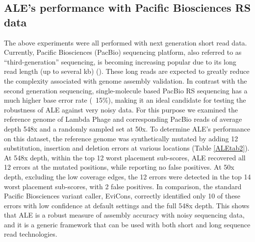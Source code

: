 \documentclass[phd,tocprelim]{cornell}
\begin{document}
\subsection{ALE's performance with Pacific Biosciences RS data}
The above experiments were all performed with next generation short read data. Currently, Pacific Biosciences (PacBio) sequencing platform, also referred to as “third-generation” sequencing, is becoming increasing popular due to its long read length (up to several kb) (\cite{Eid2009}). These long reads are expected to greatly reduce the complexity associated with genome assembly validation. In contrast with the second generation sequencing, single-molecule based PacBio RS sequencing has a much higher base error rate (~15\%), making it an ideal candidate for testing the robustness of ALE against very noisy data. For this purpose we examined the reference genome of Lambda Phage and corresponding PacBio reads of average depth 548x and a randomly sampled set at 50x. To determine ALE's performance on this dataset, the reference genome was synthetically mutated by adding 12 substitution, insertion and deletion errors at various locations (Table \ref{ALEtab2}). At 548x depth, within the top 12 worst placement sub-scores, ALE recovered all 12 errors at the mutated positions, while reporting no false positives. At 50x depth, excluding the low coverage edges, the 12 errors were detected in the top 14 worst placement sub-scores, with 2 false positives.  In comparison, the standard Pacific Biosciences variant caller, EviCons, correctly identified only 10 of these errors with low confidence at default settings and the full 548x depth. This shows that ALE is a robust measure of assembly accuracy with noisy sequencing data, and it is a generic framework that can be used with both short and long sequence read technologies.
\end{document}
